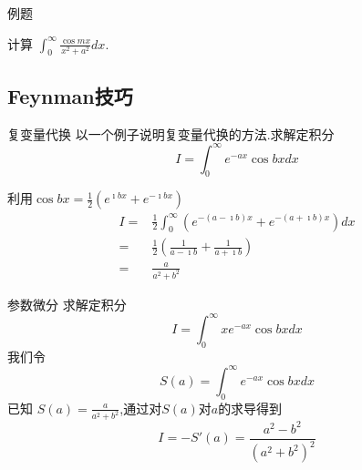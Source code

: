 \documentclass[fontset=windows, chinese, 10pt]{beamer}
\begin{document}
  
\begin{frame}{例题}
  \small
\begin{example}
计算 $\int_0^{\infty} \frac{\cos m x}{x^2+a^2} d x$.
\end{example}
\end{frame}

\subsection{Feynman技巧}

  \begin{frame}{复变量代换}
  \small
以一个例子说明复变量代换的方法.求解定积分
$$
    I =  \int_0^{\infty} e^{-a x} \cos b x d x 
$$

利用$\cos{bx} = \frac{1}{2}\left( e^{\imath b x} + e^{-\imath bx}\right)$
\[    
\begin{aligned}
    I= & \frac{1}{2} \int_{0}^{\infty} \left(e^{-(a-\imath b) x} + e^{-(a + \imath b) x} \right)  d x \\
    = & \frac{1}{2} \left( \frac{1}{a-\imath b} +  \frac{1}{a+\imath b} \right)\\
    = & \frac{a}{a^2+b^2}
\end{aligned}
\]
\end{frame}

  \begin{frame}{参数微分}
  \small
求解定积分
$$
    I =  \int_0^{\infty} x e^{-a x} \cos b x d x 
$$
我们令
$$
  S(a) =   \int_0^{\infty} e^{-a x} \cos b x d x 
$$
已知 $S(a) = \frac{a}{a^2+b^2}$,通过对$S(a)$对$a$的求导得到
$$
    I = - S'(a)  = \frac{a^2 - b^2}{(a^2 +b^2)^2}    
$$
  \end{frame}
  
\end{document}
